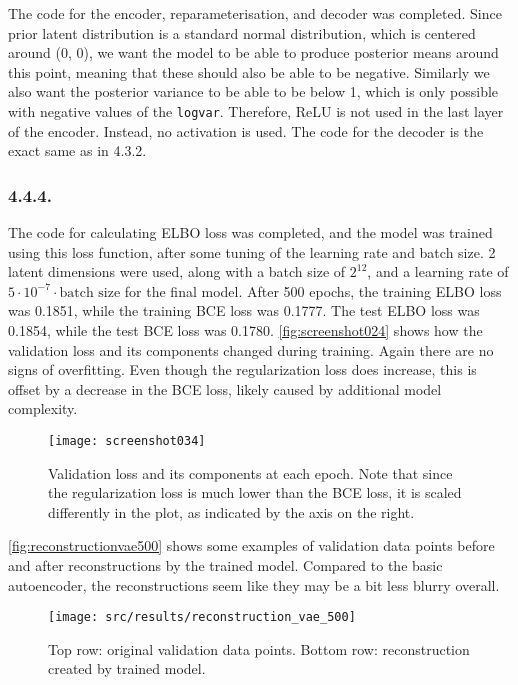 \documentclass[a4paper, 12pt]{article}
\begin{document}
The code for the encoder, reparameterisation, and decoder was completed. Since prior latent distribution is a standard normal distribution, which is centered around (0, 0), we want the model to be able to produce posterior means around this point, meaning that these should also be able to be negative. Similarly we also want the posterior variance to be able to be below 1, which is only possible with negative values of the \texttt{logvar}. Therefore, ReLU is not used in the last layer of the encoder. Instead, no activation is used. The code for the decoder is the exact same as in 4.3.2.

\subsubsection{4.4.4.}

The code for calculating ELBO loss was completed, and the model was trained using this loss function, after some tuning of the learning rate and batch size. 2 latent dimensions were used, along with a batch size of $2^{12}$, and a learning rate of $5 \cdot 10^{-7} \cdot \text{batch size}$ for the final model. After 500 epochs, the training ELBO loss was 0.1851, while the training BCE loss was 0.1777. The test ELBO loss was 0.1854, while the test BCE loss was 0.1780.
\autoref{fig:screenshot024} shows how the validation loss and its components changed during training. Again there are no signs of overfitting. Even though the regularization loss does increase, this is offset by a decrease in the BCE loss, likely caused by additional model complexity.

\begin{figure}[H]
	\centering
	\texttt{[image: screenshot034]}
	\caption{Validation loss and its components at each epoch. Note that since the regularization loss is much lower than the BCE loss, it is scaled differently in the plot, as indicated by the axis on the right.}
	\label{fig:screenshot024}
\end{figure}

\autoref{fig:reconstructionvae500} shows some examples of validation data points before and after reconstructions by the trained model. Compared to the basic autoencoder, the reconstructions seem like they may be a bit less blurry overall.

\begin{figure}[H]
	\centering
	\texttt{[image: src/results/reconstruction\_vae\_500]}
	\caption{Top row: original validation data points. Bottom row: reconstruction created by trained model.}
	\label{fig:reconstructionvae500}
\end{figure}
\end{document}
